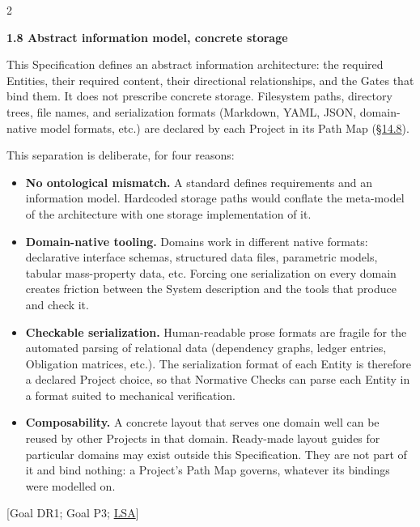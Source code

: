 \begin{multicols}{2}
\par\smallskip\noindent\textbf{1.8 Abstract information model, concrete storage}\par\nopagebreak

This Specification defines an abstract information architecture: the required Entities, their required content, their directional relationships, and the Gates that bind them. It does not prescribe concrete storage. Filesystem paths, directory trees, file names, and serialization formats (Markdown, YAML, JSON, domain-native model formats, etc.) are declared by each Project in its Path Map (\hyperlink{nss-14.8}{\S14.8}).

This separation is deliberate, for four reasons:

\begin{itemize}\setlength{\itemsep}{0pt}\setlength{\parskip}{0pt}

\item \textbf{No ontological mismatch.} A standard defines requirements and an information model. Hardcoded storage paths would conflate the meta-model of the architecture with one storage implementation of it.

\item \textbf{Domain-native tooling.} Domains work in different native formats: declarative interface schemas, structured data files, parametric models, tabular mass-property data, etc. Forcing one serialization on every domain creates friction between the System description and the tools that produce and check it.

\item \textbf{Checkable serialization.} Human-readable prose formats are fragile for the automated parsing of relational data (dependency graphs, ledger entries, Obligation matrices, etc.). The serialization format of each Entity is therefore a declared Project choice, so that Normative Checks can parse each Entity in a format suited to mechanical verification.

\item \textbf{Composability.} A concrete layout that serves one domain well can be reused by other Projects in that domain. Ready-made layout guides for particular domains may exist outside this Specification. They are not part of it and bind nothing: a Project's Path Map governs, whatever its bindings were modelled on.

\end{itemize}

[Goal DR1; Goal P3; \hyperlink{gp-LSA}{LSA}]


\end{multicols}
